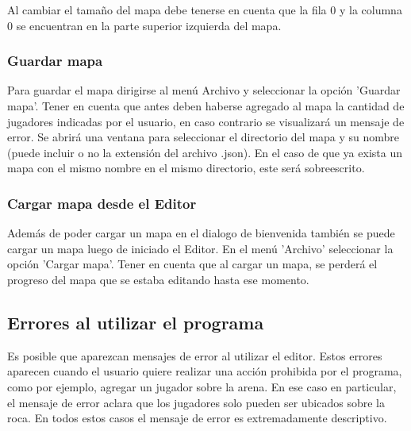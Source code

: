 \documentclass[titlepage,a4paper,12pt]{article}
\begin{document}
Al cambiar el tamaño del mapa debe tenerse en cuenta que la fila 0 y la columna 0 se encuentran en la parte superior izquierda del mapa.\\

\subsubsection{Guardar mapa}

Para guardar el mapa dirigirse al menú Archivo y seleccionar la opción 'Guardar mapa'. Tener en cuenta que antes deben haberse agregado al mapa la cantidad de jugadores indicadas por el usuario, en caso contrario se visualizará un mensaje de error. Se abrirá una ventana para seleccionar el directorio del mapa y su nombre (puede incluir o no la extensión del archivo .json). En el caso de que ya exista un mapa con el mismo nombre en el mismo directorio, este será sobreescrito.

\subsubsection{Cargar mapa desde el Editor}

Además de poder cargar un mapa en el dialogo de bienvenida también se puede cargar un mapa luego de iniciado el Editor. En el menú 'Archivo' seleccionar la opción 'Cargar mapa'. Tener en cuenta que al cargar un mapa, se perderá el progreso del mapa que se estaba editando hasta ese momento.

\subsection{Errores al utilizar el programa}

Es posible que aparezcan mensajes de error al utilizar el editor. Estos errores aparecen cuando el usuario quiere realizar una acción prohibida por el programa, como por ejemplo, agregar un jugador sobre la arena. En ese caso en particular, el mensaje de error aclara que los jugadores solo pueden ser ubicados sobre la roca. En todos estos casos el mensaje de error es extremadamente descriptivo.
\end{document}

